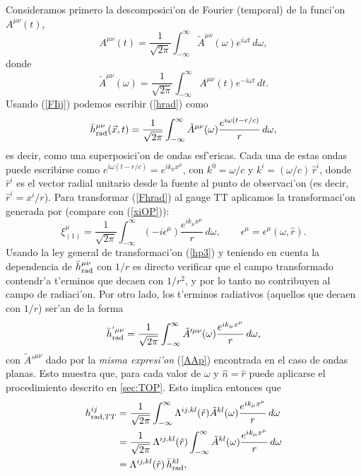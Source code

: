 Consideramos primero la descomposici'on de Fourier (temporal) de la funci'on $A^{\mu\nu}(t)$,
\begin{equation}\label{FIij}
A^{\mu\nu}(t)=\frac{1}{\sqrt{2\pi}}\int_{-\infty}^\infty \tilde{A}^{\mu\nu}(\omega)e^{i\omega t}\,d\omega,
\end{equation}
donde
\begin{equation}
\tilde{A}^{\mu\nu}(\omega)=\frac{1}{\sqrt{2\pi}}\int_{-\infty}^\infty A^{\mu\nu}(t)e^{-i\omega t}\,dt.
\end{equation}
Usando (\ref{FIij}) podemos escribir (\ref{hrad}) como
\begin{equation}\label{Fhrad}
\bar{h}_{\rm rad}^{\mu\nu}(\vec{x},t)=\frac{1}{\sqrt{2\pi}}\int_{-\infty}^\infty \tilde{A}^{\mu\nu}(\omega)\frac{e^{i\omega (t-r/c)}}{r}\,d\omega,
\end{equation}
es decir, como una superposici'on de ondas esf'ericas. Cada una de estas ondas puede escribirse como $e^{i\omega (t-r/c)}=e^{ik_\mu x^\mu}$, con $k^0=\omega/c$ y $k^i=(\omega/c)\,\hat{r}^i$, donde $\hat{r}^i$ es el vector radial unitario desde la fuente al punto de observaci'on (es decir, $\hat{r}^i=x^i/r$). Para transformar (\ref{Fhrad}) al gauge TT aplicamos la transformaci'on generada por (compare con (\ref{xiOP})):
\begin{equation}
\xi^\mu_{(1)}=\frac{1}{\sqrt{2\pi}}\int_{-\infty}^\infty (-i\epsilon^\mu)\frac{e^{ik_\mu x^\mu}}{r}\,d\omega, \qquad \epsilon^\mu=\epsilon^\mu(\omega,\hat{r}).
\end{equation}
Usando la ley general de transformaci'on (\ref{hp3}) y teniendo en cuenta la
dependencia de $\bar{h}_{\rm rad}^{\mu\nu}$ con $1/r$ es directo verificar que
el campo transformado contendr'a t'erminos que decaen con $1/r^2$, y por lo tanto no contribuyen al campo de radiaci'on. Por otro lado, los t'erminos radiativos (aquellos que decaen con $1/r$) ser'an de la forma
\begin{equation}
\bar{h}_{\rm rad}^{'\mu\nu}=\frac{1}{\sqrt{2\pi}}\int_{-\infty}^\infty \tilde{A}'^{\mu\nu}(\omega)\frac{e^{ik_\mu x^\mu}}{r}\,d\omega,
\end{equation}
con $\tilde{A}'^{\mu\nu}$ dado por la \textit{misma expresi'on} (\ref{AAp}) encontrada en el caso de ondas planas. Esto muestra que, para cada valor de $\omega$ y $\hat{n}=\hat{r}$ puede aplicarse el procedimiento descrito en \ref{sec:TOP}. Esto implica entonces que
\begin{align}
h_{{\rm rad}, TT}^{ij} &= \frac{1}{\sqrt{2\pi}}\int_{-\infty}^\infty \Lambda^{ij,kl}(\hat{r})\tilde{A}^{kl}(\omega)\frac{e^{ik_\mu x^\mu}}{r}\,d\omega \\
&= \frac{1}{\sqrt{2\pi}}\,\Lambda^{ij,kl}(\hat{r})\int_{-\infty}^\infty \tilde{A}^{kl}(\omega)\frac{e^{ik_\mu x^\mu}}{r}\,d\omega \\
&= \Lambda^{ij,kl}(\hat{r})\,\bar{h}_{\rm rad}^{kl},
\end{align}
